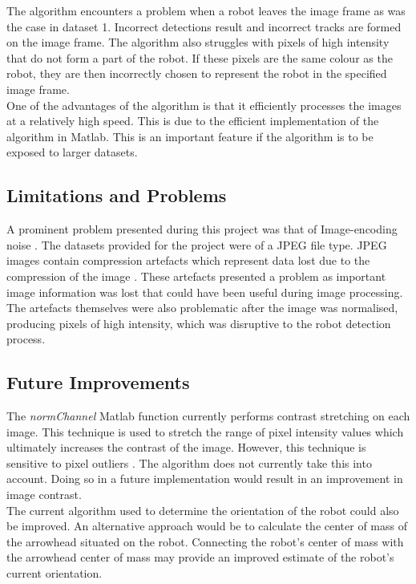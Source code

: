 \documentclass{article}
\begin{document}
The algorithm encounters a problem when a robot leaves the image frame as was the case in dataset 1. Incorrect detections result and incorrect tracks are formed on the image frame. The algorithm also struggles with pixels of high intensity that do not form a part of the robot. If these pixels are the same colour as the robot, they are then incorrectly chosen to represent the robot in the specified image frame.\\

One of the advantages of the algorithm is that it efficiently processes the images at a relatively high speed. This is due to the efficient implementation of the algorithm in Matlab. This is an important feature if the algorithm is to be exposed to larger datasets.

\subsection{Limitations and Problems}
\label{sec:limits}
A prominent problem presented during this project was that of Image-encoding noise \cite{ref:digitalProcessing}. The datasets provided for the project were of a JPEG file type. JPEG images contain compression artefacts which represent data lost due to the compression of the image \cite{ref:digitalProcessing}. These artefacts presented a problem as important image information was lost that could have been useful during image processing. The artefacts themselves were also problematic after the image was normalised, producing pixels of high intensity, which was disruptive to the robot detection process. 

 

\subsection{Future Improvements}
\label{sec:improve}
The \textit{normChannel} Matlab function currently performs contrast stretching on each image. This technique is used to stretch the range of pixel intensity values which ultimately increases the contrast of the image. However, this technique is sensitive to pixel outliers \cite{ref:digitalProcessing}. The algorithm does not currently take this into account. Doing so in a future implementation would result in an improvement in image contrast.\\

The current algorithm used to determine the orientation of the robot could also be improved. An alternative approach would be to calculate the center of mass of the arrowhead situated on the robot. Connecting the robot's center of mass with the arrowhead center of mass may provide an improved estimate of the robot's current orientation.\\
\end{document}
